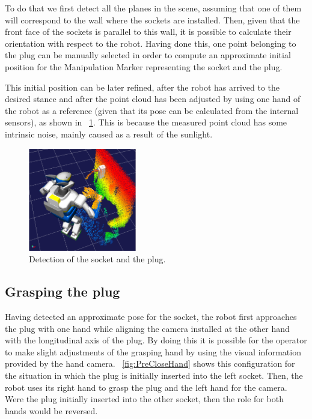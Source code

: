 		To do that we first detect all the planes in the scene, assuming that one of them will correspond
		to the wall where the sockets are installed.
		Then, given that the front face of the sockets is parallel to this wall, it is possible
		to calculate their orientation with respect to the robot.
		Having done this, one point belonging to the plug can be manually selected in order to compute
		an approximate initial position for the Manipulation Marker representing the socket and the plug.
		
		This initial position can be later refined, after the robot has arrived to the desired stance and
		after the point cloud has been adjusted by using one hand of the robot as a reference
		(given that its pose can be calculated from the internal sensors), as shown in
		\figurename~\ref{fig:SocketPlugMarker}.
		This is because the measured point cloud has some intrinsic noise, mainly caused as a result of
		the sunlight.
		
		\begin{figure}[b]
			\centering
			\includegraphics[height = 4.5cm]{img/SocketPlugMarker}
			\caption{Detection of the socket and the plug.}
			\label{fig:SocketPlugMarker}
		\end{figure}
		
	\subsection{Grasping the plug}
		
		Having detected an approximate pose for the socket, the robot first approaches the plug
		with one hand while aligning the camera installed at the other hand with the longitudinal axis
		of the plug.
		By doing this it is possible for the operator to make slight adjustments of the grasping hand
		by using the visual information provided by the hand camera.
		\figurename~\ref{fig:PreCloseHand} shows this configuration for the situation in which the plug
		is initially inserted into the left socket.
		Then, the robot uses its right hand to grasp the plug and the left hand for the camera.
		Were the plug initially inserted into the other socket, then the role for both hands would be
		reversed.
		
